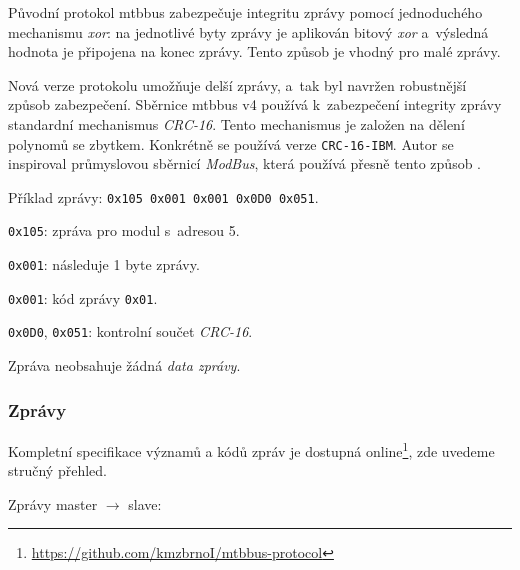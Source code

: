 \begin{enumerate}
Původní protokol \gls{mtbbus} zabezpečuje integritu zprávy pomocí jednoduchého
mechanismu \textit{xor}: na jednotlivé byty zprávy je aplikován bitový
\textit{xor} a~výsledná hodnota je připojena na konec zprávy. Tento způsob je
vhodný pro malé zprávy.

Nová verze protokolu umožňuje delší zprávy, a~tak byl navržen robustnější
způsob zabezpečení. Sběrnice \gls{mtbbus} v4 používá k~zabezpečení
integrity zprávy standardní mechanismus \textit{CRC-16}. Tento mechanismus je
založen na dělení polynomů se zbytkem. Konkrétně se používá verze
\texttt{CRC-16-IBM}. Autor se inspiroval průmyslovou sběrnicí
\textit{ModBus}, která používá přesně tento způsob \cite{modbus-specs}.

\end{enumerate}

Příklad zprávy: \texttt{0x105 0x001 0x001 0x0D0 0x051}.

\begin{compactenum}
\item \texttt{0x105}: zpráva pro modul s~adresou 5.
\item \texttt{0x001}: následuje 1 byte zprávy.
\item \texttt{0x001}: kód zprávy \texttt{0x01}.
\item \texttt{0x0D0}, \texttt{0x051}: kontrolní součet \textit{CRC-16}.
\end{compactenum}

Zpráva neobsahuje žádná \textit{data zprávy}.

\subsubsection{Zprávy} \label{subsub:mtbbus-messages}

Kompletní specifikace významů a kódů zpráv je dostupná
online\footnote{\url{https://github.com/kmzbrnoI/mtbbus-protocol}}, zde uvedeme
struč\-ný přehled.

Zprávy master $\rightarrow$ slave:

